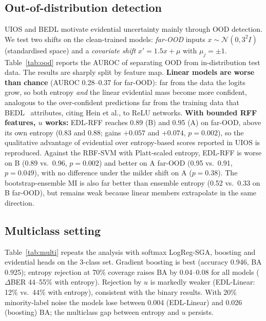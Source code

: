 \documentclass[conference]{IEEEtran}
\begin{document}
\subsection{Out-of-distribution detection}
UIOS and BEDL motivate evidential uncertainty mainly through OOD detection. We test two shifts on the clean-trained models: \emph{far-OOD} inputs $x\sim\mathcal N(0,3^2I)$ (standardised space) and a \emph{covariate shift} $x'=1.5x+\mu$ with $\mu_j=\pm1$. Table~\ref{tab:ood} reports the AUROC of separating OOD from in-distribution test data. The results are sharply split by feature map. \textbf{Linear models are worse than chance} (AUROC 0.28--0.37 for far-OOD): far from the data the logits grow, so both entropy \emph{and} the linear evidential mass become more confident, analogous to the over-confident predictions far from the training data that BEDL~\cite{tchokponhoue2026bedl} attributes, citing Hein et al., to ReLU networks. \textbf{With bounded RFF features, $u$ works:} EDL-RFF reaches 0.89 (B) and 0.95 (A) on far-OOD, above its own entropy (0.83 and 0.88; gains $+0.057$ and $+0.074$, $p=0.002$), so the qualitative advantage of evidential over entropy-based scores reported in UIOS is reproduced. Against the RBF-SVM with Platt-scaled entropy, EDL-RFF is worse on B (0.89 vs.\ 0.96, $p=0.002$) and better on A far-OOD (0.95 vs.\ 0.91, $p=0.049$), with no difference under the milder shift on A ($p=0.38$). The bootstrap-ensemble MI is also far better than ensemble entropy (0.52 vs.\ 0.33 on B far-OOD), but remains weak because linear members extrapolate in the same direction.

\begin{table}[t]
\centering\caption{OOD detection AUROC (mean $\pm$ s.d. over 10 seeds); 0.5 is chance.}\label{tab:ood}
\footnotesize\resizebox{\textwidth}{!}{}
\end{table}

\subsection{Multiclass setting}
Table~\ref{tab:multi} repeats the analysis with softmax LogReg-SGA, boosting and evidential heads on the 3-class set. Gradient boosting is best (accuracy 0.946, BA 0.925); entropy rejection at 70\% coverage raises BA by 0.04--0.08 for all models ($\Delta$BER 44--55\% with entropy). Rejection by $u$ is markedly weaker (EDL-Linear: 12\% vs.\ 44\% with entropy), consistent with the binary results. With 20\% minority-label noise the models lose between 0.004 (EDL-Linear) and 0.026 (boosting) BA; the multiclass gap between entropy and $u$ persists.
\end{document}
